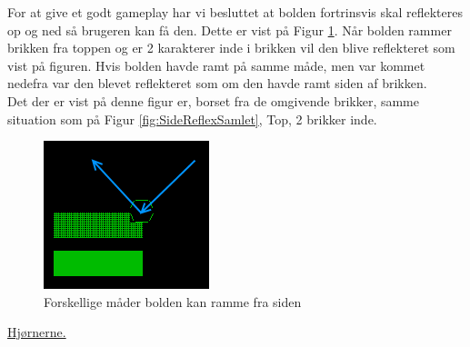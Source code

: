 For at give et godt gameplay har vi besluttet at bolden fortrinsvis skal reflekteres op og ned så brugeren kan få den. Dette er vist på Figur \ref{fig:ReflexOppeFri}. Når bolden rammer brikken fra toppen og er 2 karakterer inde i brikken vil den blive reflekteret som vist på figuren. Hvis bolden havde ramt på samme måde, men var kommet nedefra var den blevet reflekteret som om den havde ramt siden af brikken.\\

Det der er vist på denne figur er, borset fra de omgivende brikker, samme situation som på Figur \ref{fig:SideReflexSamlet}, Top, 2 brikker inde. 
\begin{figure}[h!]
\centering
\includegraphics[scale=1]{figs/reflex_oppe_fri.png}
\caption{Forskellige måder bolden kan ramme fra siden}
\label{fig:ReflexOppeFri}
\end{figure}

\underline{Hjørnerne.}\\

